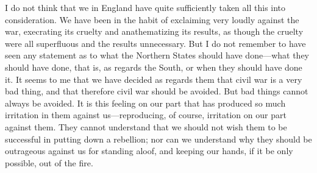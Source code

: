 I do not think that we in England have quite sufficiently taken all
this into consideration.  We have been in the habit of exclaiming
very loudly against the war, execrating its cruelty and
anathematizing its results, as though the cruelty were all
superfluous and the results unnecessary.  But I do not remember to
have seen any statement as to what the Northern States should have
done---what they should have done, that is, as regards the South, or
when they should have done it.  It seems to me that we have decided
as regards them that civil war is a very bad thing, and that
therefore civil war should be avoided.  But bad things cannot
always be avoided.  It is this feeling on our part that has
produced so much irritation in them against us---reproducing, of
course, irritation on our part against them.  They cannot
understand that we should not wish them to be successful in putting
down a rebellion; nor can we understand why they should be
outrageous against us for standing aloof, and keeping our hands, if
it be only possible, out of the fire.

